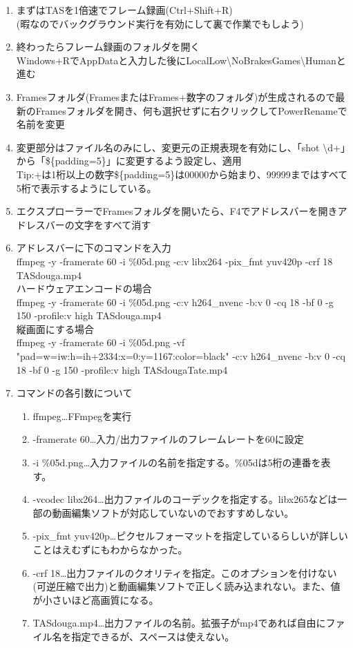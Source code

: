 \documentclass[fontsize=11bp,paper=a4paper]{jlreq}
\begin{document}
\begin{enumerate}
\begin{enumerate}
\item まずはTASを1倍速でフレーム録画(Ctrl+Shift+R)\\
\noindent (暇なのでバックグラウンド実行を有効にして裏で作業でもしよう)
\item 終わったらフレーム録画のフォルダを開く\\
\noindent Windows+RでAppDataと入力した後にLocalLow\textbackslash NoBrakesGames\textbackslash Humanと進む
\item Framesフォルダ(FramesまたはFrames+数字のフォルダ)が生成されるので最新のFramesフォルダを開き、何も選択せずに右クリックしてPowerRenameで名前を変更
\item 変更部分はファイル名のみにし、変更元の正規表現を有効にし、「shot \textbackslash d+」から「\$\{padding=5\}」に変更するよう設定し、適用\\
\noindent Tip:\d+は1桁以上の数字\$\{padding=5\}は00000から始まり、99999まではすべて5桁で表示するようにしている。
\item エクスプローラーでFramesフォルダを開いたら、F4でアドレスバーを開きアドレスバーの文字をすべて消す
\item アドレスバーに下のコマンドを入力\\
\noindent ffmpeg -y -framerate 60 -i \%05d.png -c:v libx264 -pix\_fmt yuv420p -crf 18 TASdouga.mp4\\
\noindent ハードウェアエンコードの場合\\
\noindent ffmpeg -y -framerate 60 -i \%05d.png -c:v h264\_nvenc -b:v 0 -cq 18 -bf 0 -g 150 -profile:v high TASdouga.mp4\\
\noindent 縦画面にする場合\\
\noindent ffmpeg -y -framerate 60 -i \%05d.png -vf "pad=w=iw:h=ih+2334:x=0:y=1167:color=black" -c:v h264\_nvenc -b:v 0 -cq 18 -bf 0 -g 150 -profile:v high TASdougaTate.mp4
\item コマンドの各引数について
\begin{enumerate}
\item ffmpeg…FFmpegを実行
\item -framerate 60…入力/出力ファイルのフレームレートを60に設定
\item -i \%05d.png…入力ファイルの名前を指定する。\%05dは5桁の連番を表す。
\item -vcodec libx264…出力ファイルのコーデックを指定する。libx265などは一部の動画編集ソフトが対応していないのでおすすめしない。
\item -pix\_fmt yuv420p…ピクセルフォーマットを指定しているらしいが詳しいことはえむずにもわからなかった。
\item -crf 18…出力ファイルのクオリティを指定。このオプションを付けない(可逆圧縮で出力)と動画編集ソフトで正しく読み込まれない。また、値が小さいほど高画質になる。
\item TASdouga.mp4…出力ファイルの名前。拡張子がmp4であれば自由にファイル名を指定できるが、スペースは使えない。
\end{enumerate}
\end{enumerate}
\end{enumerate}
\end{document}
